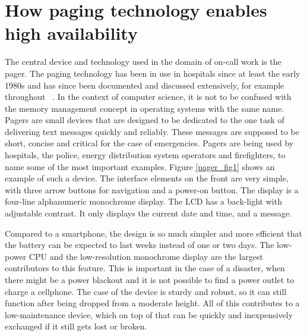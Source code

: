 \documentclass{CML_Seminar_Template}
\begin{document}



\section{How paging technology enables high availability}
The central device and technology used in the domain of on-call work is the pager. The paging technology has been in use in hospitals since at least the early 1980s and has since been documented and discussed extensively, for example throughout ~\cite{boucher1992paging}. In the context of computer science, it is not to be confused with the memory management concept in operating systems with the same name.
Pagers are small devices that are designed to be dedicated to the one task of delivering text messages quickly and reliably. These messages are supposed to be short, concise and critical for the case of emergencies. Pagers are being used by hospitals, the police, energy distribution system operators and firefighters, to name some of the most important examples. Figure \ref{pager_fig1} shows an example of such a device. The interface elements on the front are very simple, with three arrow buttons for navigation and a power-on button. The display is a four-line alphanumeric monochrome display. The LCD has a back-light with adjustable contrast. It only displays the current date and time, and a message.
\par
Compared to a smartphone, the design is so much simpler and more efficient that the battery can be expected to last weeks instead of one or two days. The low-power CPU and the low-resolution monochrome display are the largest contributors to this feature. This is important in the case of a disaster, when there might be a power blackout and it is not possible to find a power outlet to charge a cellphone. The case of the device is sturdy and robust, so it can still function after being dropped from a moderate height. All of this contributes to a low-maintenance device, which on top of that can be quickly and inexpensively exchanged if it still gets lost or broken.
\end{document}
